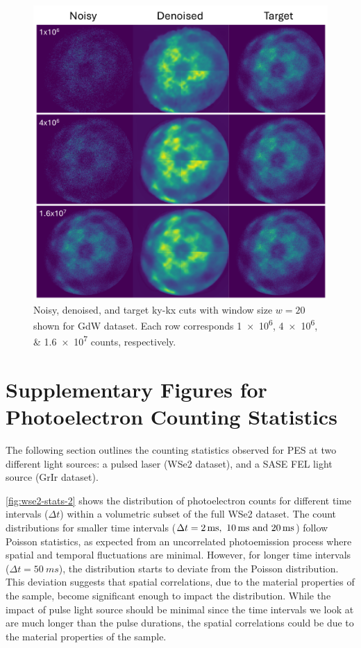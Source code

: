 \begin{figure}[h]
    \centering
    \includegraphics[width=1\linewidth]{images/nn_denoised_xy_20_slice.pdf}
    \caption{Noisy, denoised, and target \gls{ky}-\gls{kx} cuts with window size $w=20$ shown for \gls{GdW} dataset. Each row corresponds \numlist{1e6;4e6;1.6e7} counts, respectively.}
    \label{fig:nn-denoised-xy-20-slice}
\end{figure}

\FloatBarrier
\section{Supplementary Figures for Photoelectron Counting Statistics}
The following section outlines the counting statistics observed for \gls{PES} at two different light sources: a pulsed laser (\gls{WSe2} dataset), and a \gls{SASE} \gls{FEL} light source (\gls{GrIr} dataset). 

\cref{fig:wse2-stats-2} shows the distribution of photoelectron counts for different time intervals ($\Delta t$) within a volumetric subset of the full \gls{WSe2} dataset. The count distributions for smaller time intervals ($\Delta t = \qtylist{2;10;20}{ms}$) follow Poisson statistics, as expected from an uncorrelated photoemission process where spatial and temporal fluctuations are minimal. However, for longer time intervals ($\Delta t = \qty{50}{ms}$), the distribution starts to deviate from the Poisson distribution. This deviation suggests that spatial correlations, due to the material properties of the sample, become significant enough to impact the distribution. While the impact of pulse light source should be minimal since the time intervals we look at are much longer than the pulse durations, the spatial correlations could be due to the material properties of the sample.


